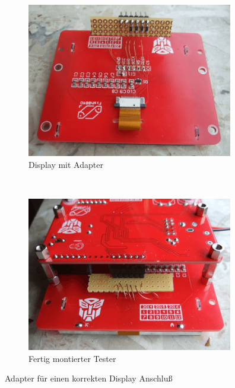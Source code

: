 \begin{figure}[H]
  \begin{subfigure}[b]{9cm}
    \centering
    \includegraphics[width=9cm]{../PNG/Fish8840Adapt1.png}
    \caption{Display mit Adapter}
  \end{subfigure}
  ~
  \begin{subfigure}[b]{9cm}
    \centering
    \includegraphics[width=9cm]{../PNG/Fish8840Adapt2.png}
    \caption{Fertig montierter Tester}
  \end{subfigure}
  \caption{Adapter für einen korrekten Display Anschluß}
  \label{fig:Fish8840Adapt}
\end{figure}

